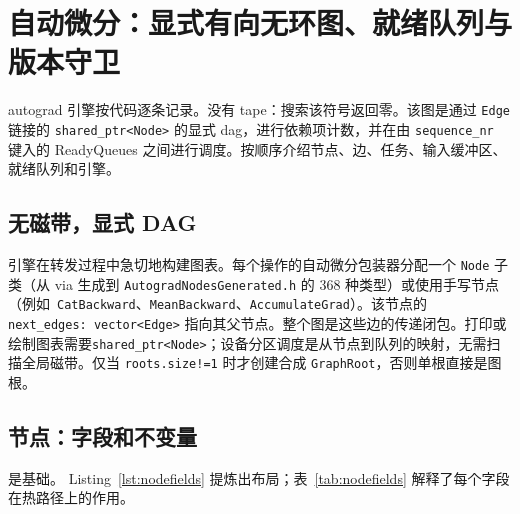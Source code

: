 \section{自动微分：显式有向无环图、就绪队列与版本守卫}
\label{sec:autograd}

autograd 引擎按代码逐条记录。没有 \ac{tape}：搜索该符号返回零。该图是通过 \texttt{Edge} 链接的 \texttt{shared\_ptr<Node>} 的显式 \ac{dag}，进行依赖项计数，并在由 \texttt{sequence\_nr} 键入的 ReadyQueues 之间进行调度。按顺序介绍节点、边、任务、输入缓冲区、就绪队列和引擎。

\subsection{无磁带，显式 DAG}
\label{subsec:notape}

引擎在转发过程中急切地构建图表。每个操作的自动微分包装器分配一个 \texttt{Node} 子类（从 via 生成到 \texttt{AutogradNodesGenerated.h} 的 368 种类型）或使用手写节点（例如\ \texttt{CatBackward}、\texttt{MeanBackward}、\texttt{AccumulateGrad}）。该节点的 \texttt{next\_edges:\ vector<Edge>} 指向其父节点。整个图是这些边的传递闭包。打印或绘制图表需要\texttt{shared\_ptr<Node>}；设备分区调度是从节点到队列的映射，无需扫描全局磁带。仅当 \texttt{roots.size!=1} 时才创建合成 \texttt{GraphRoot}，否则单根直接是图根。

\subsection{节点：字段和不变量}
\label{subsec:node}

是基础。 Listing~\ref{lst:nodefields} 提炼出布局；表~\ref{tab:nodefields} 解释了每个字段在热路径上的作用。

